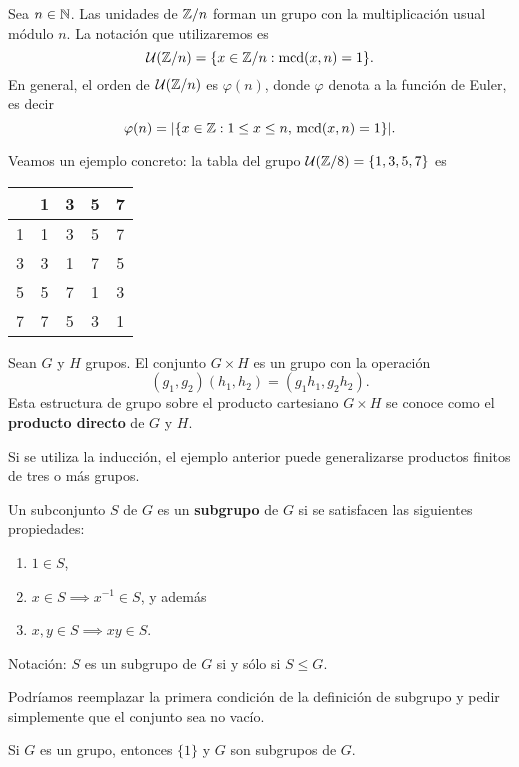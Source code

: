 \begin{example}
Sea $n\in\mathbb{N}$. Las unidades de $\mathbb{Z}/n$ forman un grupo con la multiplicación usual módulo $n$. La notación que utilizaremos es
\[	
\mathcal{U}(\mathbb{Z}/n)=\{x\in\mathbb{Z}/n:\operatorname{mcd}(x,n)=1\}.
\]
En general, el orden de $\mathcal{U}(\mathbb{Z}/n)$ es $\varphi(n)$, donde $\varphi$ denota a la función de Euler, es decir
\[
\varphi(n)=|\{x\in\mathbb{Z}:1\leq x\leq n,\,\operatorname{mcd}(x,n)=1\}|.
\]

Veamos un ejemplo concreto: la tabla del grupo 
$\mathcal{U}(\mathbb{Z}/8)=\{1,3,5,7\}$
es
\begin{center}
  \begin{tabular}{l|cccc}
     &1&3&5&7 \\
    \hline
    1 & 1 & 3 & 5 & 7\\
    3 & 3 & 1 & 7 & 5\\
    5 & 5 & 7 & 1 & 3\\
    7 & 7 & 5 & 3 & 1
  \end{tabular}
\end{center}
\end{example}

\begin{exercise}
	Sean $G$ y $H$ grupos.  
	El conjunto $G\times H$ 
	es un grupo con la operación
	\[
		(g_1,g_2)(h_1,h_2)=(g_1h_1,g_2h_2).
	\]
	Esta estructura de grupo sobre el producto cartesiano $G\times H$ se conoce como
	el \textbf{producto directo} de $G$ y $H$. 
\end{exercise}

Si se utiliza la inducción, el ejemplo anterior puede generalizarse productos finitos de tres o más grupos. 

\begin{definition}
	Un subconjunto $S$ de $G$ es un \textbf{subgrupo} de $G$ si se satisfacen
	las siguientes propiedades:
	\begin{enumerate}
		\item $1\in S$, 
		\item $x\in S\implies x^{-1}\in S$, y además 
		\item $x,y\in S\implies xy\in S$.
	\end{enumerate}
	Notación: $S$ es un subgrupo de $G$ si y sólo si $S\leq G$. 
\end{definition}

Podríamos reemplazar la primera condición de la definición de subgrupo y pedir
simplemente que el conjunto sea no vacío. 

\begin{example}
	Si $G$ es un grupo, entonces $\{1\}$ y $G$ son subgrupos de $G$. 
\end{example}

